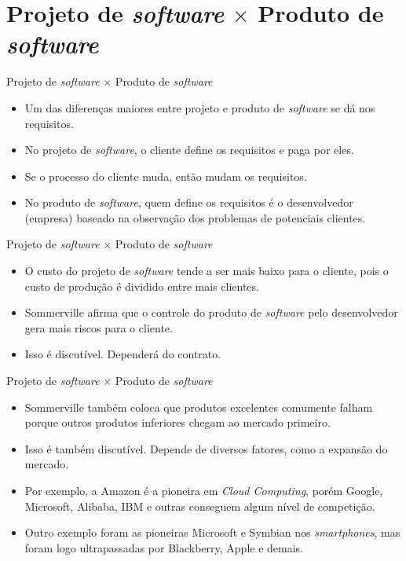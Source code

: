 \documentclass[11pt]{beamer}
\begin{document}
   \section{Projeto de \textit{software} $\times$ Produto de \textit{software}}

   \begin{frame}{Projeto de \textit{software} $\times$ Produto de \textit{software}}
      \begin{itemize}
         \item Um das diferenças maiores entre projeto e produto de \textit{software} se dá nos requisitos.
         \item No projeto de \textit{software}, o cliente define os requisitos e paga por eles.
         \item Se o processo do cliente muda, então mudam os requisitos.
         \item No produto de \textit{software}, quem define os requisitos é o desenvolvedor (empresa) baseado na observação dos problemas de potenciais clientes.      
      \end{itemize}
   \end{frame}

   \begin{frame}{Projeto de \textit{software} $\times$ Produto de \textit{software}}
      \begin{itemize}
         \item O custo do projeto de \textit{software} tende a ser mais baixo para o cliente, pois o custo de produção é dividido entre mais clientes.
         \item Sommerville afirma que o controle do produto de \textit{software} pelo desenvolvedor gera mais riscos para o cliente.
         \item Isso é discutível. Dependerá do contrato.
      \end{itemize}
   \end{frame}

   \begin{frame}{Projeto de \textit{software} $\times$ Produto de \textit{software}}
      \begin{itemize}
         \item Sommerville também coloca que produtos excelentes comumente falham porque outros produtos inferiores chegam ao mercado primeiro.
         \item Isso é também discutível. Depende de diversos fatores, como a expansão do mercado.
         \item Por exemplo, a Amazon é a pioneira em \textit{Cloud Computing}, porém Google, Microsoft, Alibaba, IBM e outras conseguem algum nível de competição.
         \item Outro exemplo foram as pioneiras Microsoft e Symbian nos \textit{smartphones}, mas foram logo ultrapassadas por Blackberry, Apple e demais.
      \end{itemize}
   \end{frame}
\end{document}
